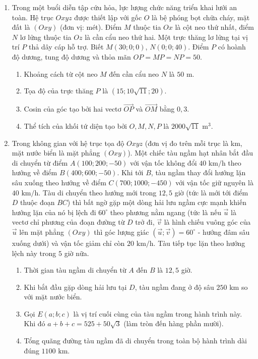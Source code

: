 \documentclass[12pt]{article}
\begin{document}
\begin{enumerate}[label=\textbf{Câu \arabic*:}, leftmargin=*]
		\vspace{3mm}
		\item Trong một buổi diễn tập cứu hỏa, lực lượng chức năng triển khai lưới an toàn. Hệ trục $Oxyz$ được thiết lập với gốc $O$ là bệ phóng bọt chữa cháy, mặt đất là $(Oxy)$ (đơn vị: mét). Điểm $M$ thuộc tia $Ox$ là cột neo thứ nhất, điểm $N$ lơ lửng thuộc tia $Oz$ là cần cẩu neo thứ hai. Một trực thăng lơ lửng tại vị trí $P$ thả dây cáp hỗ trợ. Biết $M(30; 0; 0)$, $N(0; 0; 40)$. Điểm $P$ có hoành độ dương, tung độ dương và thỏa mãn $OP = MP = NP = 50$.
		\begin{enumerate}[label=\alph*)]
			\item Khoảng cách từ cột neo $M$ đến cần cẩu neo $N$ là $50\text{ m}$.
			\item Tọa độ của trực thăng $P$ là $(15; 10\sqrt{11}; 20)$.
			\item Cosin của góc tạo bởi hai vectơ $\overrightarrow{OP}$ và $\overrightarrow{OM}$ bằng $0,3$.
			\item Thể tích của khối tứ diện tạo bởi $O, M, N, P$ là $2000\sqrt{11} \text{ m}^3$.
		\end{enumerate}
		
		\vspace{3mm}
		\item Trong không gian với hệ trục tọa độ $Oxyz$ (đơn vị đo trên mỗi trục là km, mặt nước biển là mặt phẳng $(Oxy)$). Một chiếc tàu ngầm hạt nhân bắt đầu di chuyển từ điểm $A(100; 200; -50)$ với vận tốc không đổi $40\text{ km/h}$ theo hướng về điểm $B(400; 600; -50)$. Khi tới $B$, tàu ngầm thay đổi hướng lặn sâu xuống theo hướng về điểm $C(700; 1000; -450)$ với vận tốc giữ nguyên là $40\text{ km/h}$. Tàu di chuyển theo hướng mới trong $12,5$ giờ (tức là mới tới điểm $D$ thuộc đoạn $BC$) thì bất ngờ gặp một dòng hải lưu ngầm cực mạnh khiến hướng lặn của nó bị lệch đi $60^\circ$ theo phương nằm ngang (tức là nếu $\vec{u}$ là vectơ chỉ phương của đoạn đường từ $D$ trở đi, $\vec{v}$ là hình chiếu vuông góc của $\vec{u}$ lên mặt phẳng $(Oxy)$ thì góc lượng giác $(\vec{u}; \vec{v}) = 60^\circ$ - hướng đâm sâu xuống dưới) và vận tốc giảm chỉ còn $20\text{ km/h}$. Tàu tiếp tục lặn theo hướng lệch này trong $5$ giờ nữa.
		\begin{enumerate}[label=\alph*)]
			\item Thời gian tàu ngầm di chuyển từ $A$ đến $B$ là $12,5$ giờ.
			\item Khi bắt đầu gặp dòng hải lưu tại $D$, tàu ngầm đang ở độ sâu $250\text{ km}$ so với mặt nước biển.
			\item Gọi $E(a;b;c)$ là vị trí cuối cùng của tàu ngầm trong hành trình này. Khi đó $a+b+c = 525 + 50\sqrt{3}$ (làm tròn đến hàng phần mười).
			\item Tổng quãng đường tàu ngầm đã di chuyển trong toàn bộ hành trình dài đúng $1100\text{ km}$.
		\end{enumerate}
		

\end{enumerate}
\end{document}
